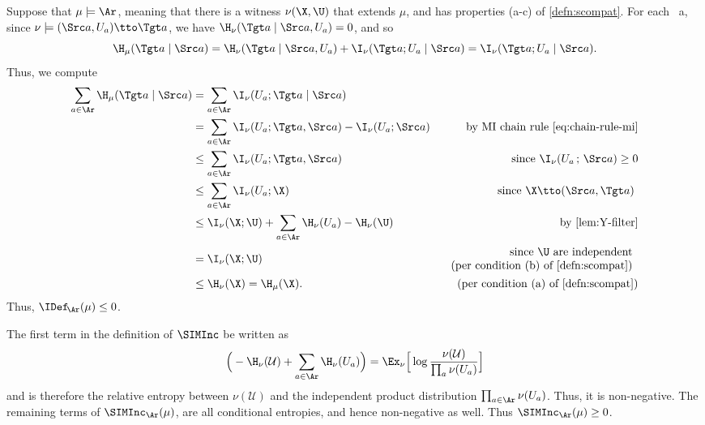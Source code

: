\begin{subappendices}
\begin{lproof}
        \label{proof:sdef-le0}
    Suppose that $\mu \models \Ar$, meaning that there is a witness $\nu(\X, \U)$ that extends $\mu$, and has properties (a-c) of \cref{defn:scompat}. 
    For each \arc\ a, since
    $\nu \models (\Src a, U_a) \tto \Tgt a$, 
    we have
    $\H_\nu(\Tgt a \mid \Src a, U_a) = 0$, and so
    \[
    \H_\mu(\Tgt a \mid \Src a) = \H_\nu(\Tgt a \mid \Src a, U_a) + \I_\nu(\Tgt a ; U_a \mid \Src a) = \I_\nu(\Tgt a; U_a \mid \Src a).
    \]
    Thus, we compute    
    \begin{align*}
        \sum_{a \in \Ar} \H_\mu(\Tgt a \mid \Src a) 
        &= \sum_{a \in \Ar} \I_\nu(U_a ; \Tgt a \mid \Src a) 
        \\
        &= \sum_{a \in \Ar} \I_\nu(U_a ; \Tgt a, \Src a) - \I_\nu(U_a ; \Src a)
            & \text{ by MI chain rule \eqref{eq:chain-rule-mi}} \\
        &\le \sum_{a \in \Ar} \I_\nu(U_a ; \Tgt a, \Src a) 
            & \text{ since $\I_\nu(U_a\,;\,\Src a) \ge 0$} 
        \\
        &\le \sum_{a \in \Ar} \I_\nu(U_a ; \X) 
            &\text{ since $\X \tto (\Src a, \Tgt a)$ }
        \\
        &\le \I_\nu(\X ; \U) + \sum_{a \in \Ar} \H_\nu( U_a ) - \H_\nu(\U)
            & \text{ by \cref{lem:Y-filter}}
        \\
        &= \I_\nu(\X ; \U) & \begin{array}{r}\text{ since $\U$ are independent}\\\text{ (per condition (b) of \cref{defn:scompat})} \end{array} \\
        &\le \H_\nu(\X) = \H_\mu(\X).
            &\text{(per condition (a) of \cref{defn:scompat})}
    \end{align*}
    Thus, $\IDef_{\!\Ar}(\mu) \le 0$. \qedhere
\end{lproof}


\begin{lproof}\label{proof:sinc-nonneg-s2}
    The first term in the definition of $\SIMInc$ be written as
    \[
        \Big( - \H_\nu(\mathcal U) + \sum_{a \in \Ar} \H_\nu(U_a)  \Big)
            = \Ex_{\nu} \Big[ \log \frac{\nu(\mathcal U)}{\prod_{a} \nu(U_a)} \Big]
    \]
    and is therefore the relative entropy between $\nu(\mathcal U)$ and 
    the independent product distribution $\prod_{a \in \Ar}\nu(U_a)$. 
    Thus, it is non-negative.
    The remaining terms of $\SIMInc_{\Ar}(\mu)$, are all conditional entropies, and hence non-negative as well.
    Thus $\SIMInc_{\Ar}(\mu) \ge 0$. 
    

\end{lproof}
\end{subappendices}
